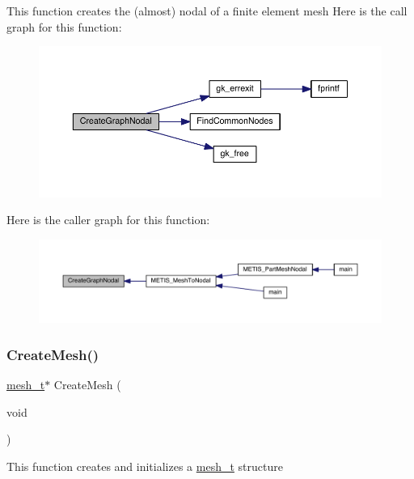 This function creates the (almost) nodal of a finite element mesh Here is the call graph for this function\+:\nopagebreak
\begin{figure}[H]
\begin{center}
\leavevmode
\includegraphics[width=350pt]{a00945_ac6018a712a429b3c401adba913c2cae3_cgraph}
\end{center}
\end{figure}
Here is the caller graph for this function\+:\nopagebreak
\begin{figure}[H]
\begin{center}
\leavevmode
\includegraphics[width=350pt]{a00945_ac6018a712a429b3c401adba913c2cae3_icgraph}
\end{center}
\end{figure}
\mbox{\label{a00945_aec1a4bd83e832be7befbf6b03e9513ad}} 
\subsubsection{\texorpdfstring{Create\+Mesh()}{CreateMesh()}}
{\footnotesize\ttfamily \hyperlink{a00738}{mesh\+\_\+t}$\ast$ Create\+Mesh (\begin{DoxyParamCaption}\item[{void}]{ }\end{DoxyParamCaption})}

This function creates and initializes a \hyperlink{a00738}{mesh\+\_\+t} structure \mbox{\label{a00945_a002ad59e8624946cc9450cb9b3c10741}} 
